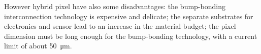    However hybrid pixel have also some disadvantages: the bump-bonding interconnection technology is expensive and delicate; the separate substrates for electronics and sensor lead to an increase in the material budget; the pixel dimension must be long enough for the bump-bonding technology, with a current limit of about \SI{50}{\um}.
